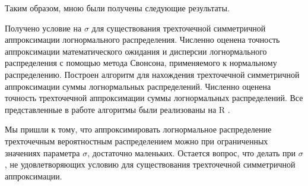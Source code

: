 \documentclass[specialist, substylefile = spbu.rtx,
subf,href,colorlinks=true, 12pt]{disser}
\begin{document}
\conclusion
Таким образом, мною были получены следующие результаты. 

Получено условие на $\sigma$ для существования трехточечной симметричной аппроксимации логнормального распределения.
Численно оценена точность аппроксимации математического ожидания и дисперсии логнормального распределения с помощью метода Свонсона, применяемого к нормальному распределению.
Построен алгоритм для нахождения трехточечной симметричной аппроксимации суммы логнормальных распределений.
Численно оценена точность трехточечной аппроксимации суммы логнормальных распределений.
Все представленные в работе алгоритмы были реализованы на R \cite{AAA}.

Мы пришли к тому, что аппроксимировать логнормальное распределение трехточечным вероятностным распределением можно при ограниченных значениях параметра $\sigma$, достаточно маленьких. Остается вопрос, что делать при $\sigma$, не удовлетворяющих условию для существования трехточечной симметричной аппроксимации.


	
\end{document}
